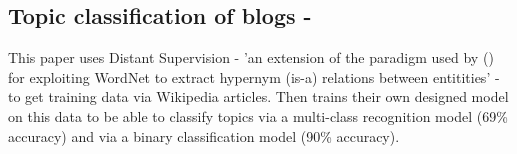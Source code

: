 \documentclass[a4paper,fleqn,10pt]{article}
\begin{document}
\subsection{Topic classification of blogs - \cite{husby2012topic}}
This paper uses Distant Supervision - 'an extension of the paradigm used by (\cite{snow}) for exploiting WordNet to extract hypernym (is-a) relations between entitities'
- to get training data via Wikipedia articles. Then trains their own designed model on this data to be able to classify topics via a
multi-class recognition model (69\% accuracy) and via a binary classification model (90\% accuracy).


\end{document}
